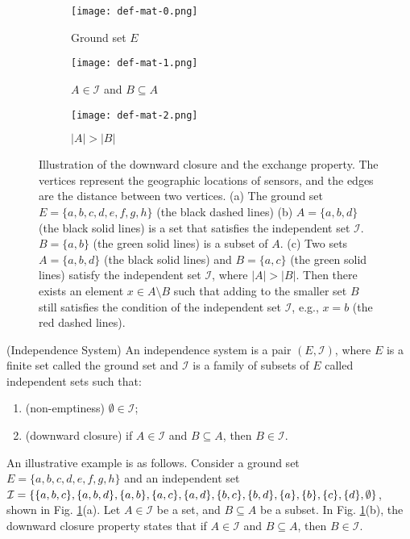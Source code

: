 \begin{figure}
   \centering
   \begin{subfigure}[b]{0.3\textwidth}
       \texttt{[image: def-mat-0.png]}
       \caption{Ground set $E$}
   \end{subfigure}
   \hfill
   \quad
   \centering
   \begin{subfigure}[b]{0.3\textwidth}
       \texttt{[image: def-mat-1.png]}
       \caption{$A \in \mathcal{I}$ and $B \subseteq A$}
   \end{subfigure}
   \hfill
   \quad
   \begin{subfigure}[b]{0.3\textwidth}
   \centering
       \texttt{[image: def-mat-2.png]}
       \caption{$|A|>|B|$}
   \end{subfigure}
   \hfill

   \caption{Illustration of the downward closure and the exchange property.
   The vertices represent the geographic locations of sensors, and the edges are the distance between two vertices. (a) The ground set $E=\{a,b,c,d,e,f,g,h\}$ (the black dashed lines) (b) $A=\{a,b,d\}$ (the black solid lines) is a set that satisfies the independent set $\mathcal{I}$. $B=\{a,b\}$ (the green solid lines) is a subset of $A$.
   (c) Two sets $A=\{a,b,d\}$ (the black solid lines) and $B=\{a,c\}$ (the green solid lines) satisfy the independent set $\mathcal{I}$, where $|A|>|B|$. Then there exists an element $x \in A \setminus B$ such that adding to the smaller set $B$ still satisfies the condition of the independent set $\mathcal{I}$, e.g., $x=b$ (the red dashed lines).
   }
   \label{def-matroid}
\end{figure}

\begin{definition} \label{def:independence-system} (Independence System) \cite{korte1978analysis}
An independence system is a pair $(E, \mathcal{I})$, where $E$ is a finite set called the ground set and $\mathcal{I}$ is a family of subsets of $E$ called independent sets such that:
\begin{enumerate}
    \item (non-emptiness) $\emptyset \in \mathcal{I}$;
    \item (downward closure) if $A\in \mathcal{I}$ and $B \subseteq A$, then $B \in \mathcal{I}$. \\
\end{enumerate}

An illustrative example is as follows.
Consider a ground set $E=\{a,b,c,d,e,f,g,h\}$ and an independent set $\mathcal{I}=\{\{a,b,c\}, \{a,b,d\}, \{a,b\}, \\ \{a,c\}, \{a,d\}, \{b,c\}, \{b,d\}, \{a\}, \{b\}, \{c\}, \{d\}, \emptyset \}$, shown in Fig. \ref{def-matroid}(a).
Let $A \in \mathcal{I}$ be a set, and $B \subseteq A$ be a subset. In Fig. \ref{def-matroid}(b), the downward closure property states that if $A\in \mathcal{I}$ and $B \subseteq A$, then $B \in \mathcal{I}$.\\
\end{definition}

